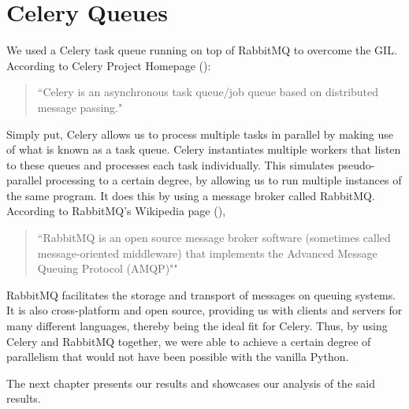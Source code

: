 \section{Celery Queues}
\label{exp:Celery}
We used a Celery task queue running on top of RabbitMQ to overcome the GIL. According to Celery Project Homepage (\cite{Celery}):
\begin{quotation}
``Celery is an asynchronous task queue/job queue based on distributed message passing."
\end{quotation}

Simply put, Celery allows us to process multiple tasks in parallel by making use of what is known as a task queue. Celery instantiates multiple workers that listen to these queues and processes each task individually. This simulates pseudo-parallel processing to a certain degree, by allowing us to run multiple instances of the same program. It does this by using a message broker called RabbitMQ.
According to RabbitMQ's Wikipedia page (\cite{wiki:RabbitMQ}),
\begin{quotation}
``RabbitMQ is an open source message broker software (sometimes called message-oriented middleware) that implements the Advanced Message Queuing Protocol (AMQP)""
\end{quotation}
RabbitMQ facilitates the storage and transport of messages on queuing systems. It is also cross-platform and open source, providing us with clients and servers for many different languages, thereby being the ideal fit for Celery.
Thus, by using Celery and RabbitMQ together, we were able to achieve a certain degree of parallelism that would not have been possible with the vanilla Python.

The next chapter presents our results and showcases our analysis of the said results.
